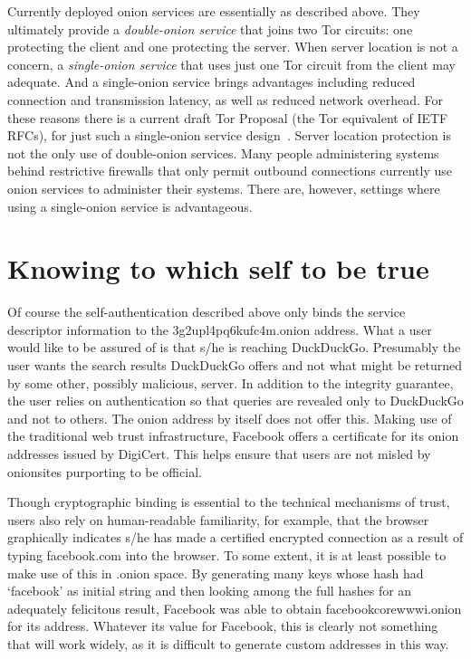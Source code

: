 \documentclass[10pt, conference, compsocconf]{styles/IEEEtran}
\begin{document}
Currently deployed onion services are essentially as described above.
They ultimately provide a \emph{double-onion service} that joins two
Tor circuits: one protecting the client and one protecting the
server. When server location is not a concern, a \emph{single-onion
  service} that uses just one Tor circuit from the client may
adequate.  And a single-onion service brings advantages including
reduced connection and transmission latency, as well as reduced
network overhead. For these reasons there is a current draft Tor
Proposal (the Tor equivalent of IETF RFCs), for just such a
single-onion service design~\cite{single-onion-proposal}. Server
location protection is not the only use of double-onion services. Many
people administering systems behind restrictive firewalls that only
permit outbound connections currently use onion services to administer
their systems. There are, however, settings where using a single-onion
service is advantageous.

\section{Knowing to which self to be true}

Of course the self-authentication described above only binds the
service descriptor information to the 3g2upl4pq6kufc4m.onion
address. What a user would like to be assured of is that s/he is
reaching DuckDuckGo. Presumably the user wants the search results
DuckDuckGo offers and not what might be returned by some other,
possibly malicious, server.  In addition to the integrity guarantee,
the user relies on authentication so that queries are revealed only to
DuckDuckGo and not to others. The onion address by itself does not
offer this. Making use of the traditional web trust infrastructure,
Facebook offers a certificate for its onion addresses
issued by DigiCert.  This helps ensure that users are not misled by
onionsites purporting to be official.

Though cryptographic binding is essential to the technical mechanisms
of trust, users also rely on human-readable familiarity, for example,
that the browser graphically indicates s/he has made a certified
encrypted connection as a result of typing facebook.com into the
browser.  To some extent, it is at least possible to make use of this
in .onion space. By generating many keys whose hash had `facebook' as
initial string and then looking among the full hashes for an
adequately felicitous result, Facebook was able to obtain
facebookcorewwwi.onion for its address. Whatever its value for
Facebook, this is clearly not something that will work widely, as it
is difficult to generate custom addresses in this way. 
\end{document}
